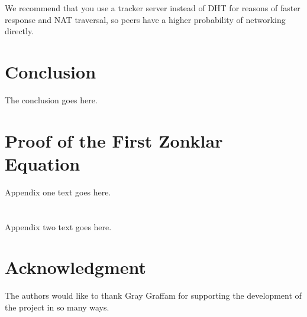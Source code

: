 \documentclass[journal]{IEEEtran}
\begin{document}
We recommend that you use a tracker server instead of DHT for reasons of faster response and NAT traversal, so peers have a higher probability of networking directly.





\section{Conclusion}
The conclusion goes here.


\appendices
\section{Proof of the First Zonklar Equation}
Appendix one text goes here.

\section{}
Appendix two text goes here.

\section*{Acknowledgment}

The authors would like to thank Gray Graffam for supporting the development of the project in so many ways.


\ifCLASSOPTIONcaptionsoff
  \newpage
\fi

\end{document}
